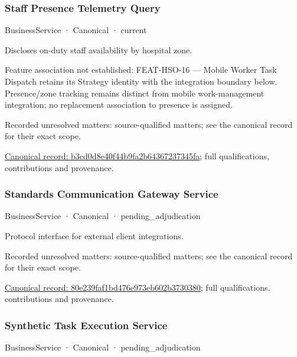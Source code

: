 \subsubsection{Staff Presence Telemetry Query}

\label{element:b3cd0d8e40f44b9fa2b64367237345fa}
{\small BusinessService · Canonical · current}\par

Discloses on-duty staff availability by hospital zone.



Feature association not established: FEAT-HSO-16 — Mobile Worker Task Dispatch retains its Strategy identity with the integration boundary below. Presence/zone tracking remains distinct from mobile work-management integration; no replacement association to presence is assigned.


{\small Recorded unresolved matters: source-qualified matters; see the canonical record for their exact scope.}\par
{\footnotesize \href{../../../../continuum/business/business-service/b3cd0d8e40f44b9fa2b64367237345fa.md}{Canonical record: b3cd0d8e40f44b9fa2b64367237345fa}; full qualifications, contributions and provenance.}\par
\subsubsection{Standards Communication Gateway Service}

\label{element:80e239faf1bd476e973eb602b3730380}
{\small BusinessService · Canonical · pending\_adjudication}\par

Protocol interface for external client integrations.


{\small Recorded unresolved matters: source-qualified matters; see the canonical record for their exact scope.}\par
{\footnotesize \href{../../../../continuum/business/business-service/80e239faf1bd476e973eb602b3730380.md}{Canonical record: 80e239faf1bd476e973eb602b3730380}; full qualifications, contributions and provenance.}\par
\subsubsection{Synthetic Task Execution Service}

\label{element:57317da133ba4e29bde3997921f92e2e}
{\small BusinessService · Canonical · pending\_adjudication}\par

